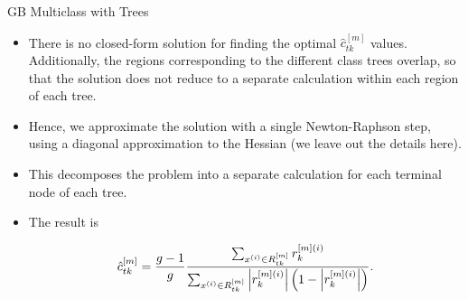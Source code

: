 \begin{vbframe}{GB Multiclass with Trees}
\framebreak


\begin{itemize}

  \item There is no closed-form solution for finding the optimal $\hat{c}_{tk}^{[m]}$ values. Additionally, the regions corresponding to the different class trees overlap, so that the solution does not reduce to a separate calculation within each region of each tree.

  \item Hence, we approximate the solution with a single Newton-Raphson step, using a diagonal approximation to the Hessian (we leave out the details here).

  \item This decomposes the problem into a separate calculation for each terminal node of each tree.

  \item The result is

  $$\hat{c}_{tk}^{[m]} =
      \frac{g-1}{g}\frac{\sum_{x^{(i)} \in R_{tk}^{[m]}} r^{[m](i)}_k}{\sum_{x^{(i)} \in R_{tk}^{[m]}} \left|r^{[m](i)}_k\right|\left(1 - \left|r^{[m](i)}_k\right|\right)}.$$


\end{itemize}

\framebreak




\end{vbframe}


